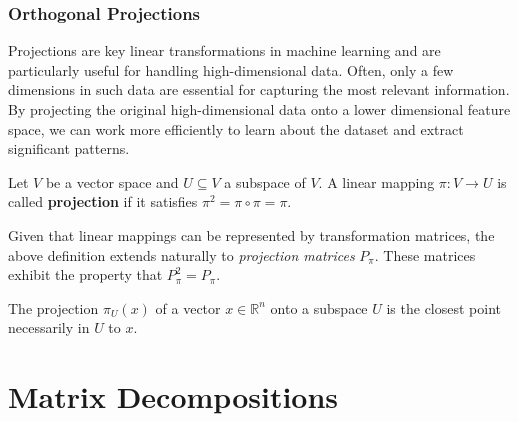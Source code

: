 \documentclass{article}
\begin{document}
\subsubsection{Orthogonal Projections}
Projections are key linear transformations in machine learning and are
particularly useful for handling high-dimensional data. Often, only a few
dimensions in such data are essential for capturing the most relevant
information. By projecting the original high-dimensional data onto a lower
dimensional feature space, we can work more efficiently to learn about the
dataset and extract significant patterns.
\begin{definition}[Projection]
    Let $V$ be a vector space and $U\subseteq V$ a subspace of $V$. A linear
    mapping $\pi:V\to U$ is called \textbf{projection} if it satisfies
    $\pi^2=\pi\circ\pi=\pi$.
\end{definition}
Given that linear mappings can be represented by transformation matrices, the
above definition extends naturally to \textit{projection matrices} $P_{\pi}$.
These matrices exhibit the property that $P_{\pi}^2=P_{\pi}$.

The projection $\pi_U(x)$ of a vector $x\in \mathbb{R}^n$ onto a subspace $U$
is the closest point necessarily in $U$ to $x$.
\cleardoublepage
\section{Matrix Decompositions}
\end{document}
